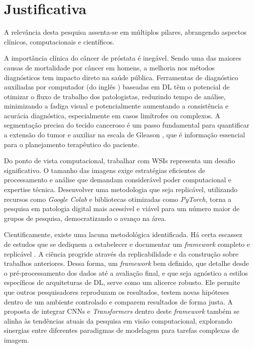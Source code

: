 \section{Justificativa}\label{sec:justificativa}
A relevância desta pesquisa assenta-se em múltiplos pilares, abrangendo aspectos clínicos, computacionais e científicos.

A importância clínica do câncer de próstata é inegável. Sendo uma das maiores causas de mortalidade por câncer em homens, a melhoria nos métodos diagnósticos tem impacto direto na saúde pública. Ferramentas de diagnóstico auxiliadas por computador (do inglês ) baseadas em DL têm o potencial de otimizar o fluxo de trabalho dos patologistas, reduzindo tempo de análise, minimizando a fadiga visual e potencialmente aumentando a consistência e acurácia diagnóstica, especialmente em casos limítrofes ou complexos. A segmentação precisa do tecido canceroso é um passo fundamental para quantificar a extensão do tumor e auxiliar na escala de Gleason \cite{Gleason1966}, que é informação essencial para o planejamento terapêutico do paciente.

Do ponto de vista computacional, trabalhar com WSIs representa um desafio significativo. O tamanho das imagens exige estratégias eficientes de processamento e análise que demandam considerável poder computacional e expertise técnica. Desenvolver uma metodologia que seja replicável, utilizando recursos como \textit{Google Colab} e bibliotecas otimizadas como \textit{PyTorch}, torna a pesquisa em patologia digital mais acessível e viável para um número maior de grupos de pesquisa, democratizando o avanço na área.

Cientificamente, existe uma lacuna metodológica identificada. Há certa escassez de estudos que se dediquem a estabelecer e documentar um \textit{framework} completo e replicável . A ciência progride através da replicabilidade e da construção sobre trabalhos anteriores. Dessa forma, um \textit{framework} bem definido, que detalhe desde o pré-processamento dos dados até a avaliação final, e que seja agnóstico a estilos específicos de arquiteturas de DL, serve como um alicerce robusto. Ele permite que outros pesquisadores reproduzam os resultados, testem novas hipóteses dentro de um ambiente controlado e comparem resultados de forma justa. A proposta de integrar CNNs e \textit{Transformers} dentro deste \textit{framework} também se alinha às tendências atuais da pesquisa em visão computacional, explorando sinergias entre diferentes paradigmas de modelagem para tarefas complexas de imagem.


